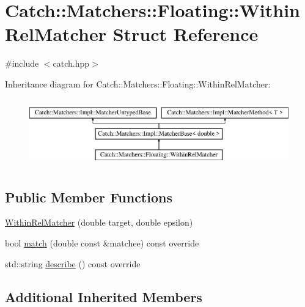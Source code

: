 \hypertarget{struct_catch_1_1_matchers_1_1_floating_1_1_within_rel_matcher}{}\section{Catch\+:\+:Matchers\+:\+:Floating\+:\+:Within\+Rel\+Matcher Struct Reference}
\label{struct_catch_1_1_matchers_1_1_floating_1_1_within_rel_matcher}


{\ttfamily \#include $<$catch.\+hpp$>$}

Inheritance diagram for Catch\+:\+:Matchers\+:\+:Floating\+:\+:Within\+Rel\+Matcher\+:\begin{figure}[H]
\begin{center}
\leavevmode
\includegraphics[height=2.968198cm]{struct_catch_1_1_matchers_1_1_floating_1_1_within_rel_matcher}
\end{center}
\end{figure}
\subsection*{Public Member Functions}
\begin{DoxyCompactItemize}
\item 
\mbox{\hyperlink{struct_catch_1_1_matchers_1_1_floating_1_1_within_rel_matcher_aadfe37f6ed9bb025c93e51e11d8bee43}{Within\+Rel\+Matcher}} (double target, double epsilon)
\item 
bool \mbox{\hyperlink{struct_catch_1_1_matchers_1_1_floating_1_1_within_rel_matcher_ac4fc68ff316028137a6d940e10d78e12}{match}} (double const \&matchee) const override
\item 
std\+::string \mbox{\hyperlink{struct_catch_1_1_matchers_1_1_floating_1_1_within_rel_matcher_aeabbf5394d7dafebe874fef8a959fe8a}{describe}} () const override
\end{DoxyCompactItemize}
\subsection*{Additional Inherited Members}


